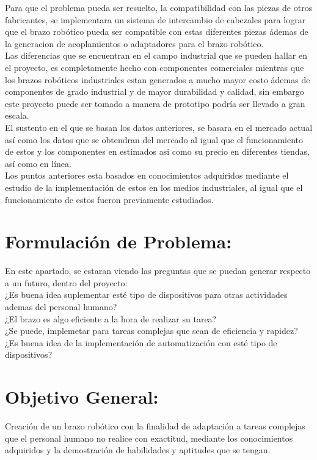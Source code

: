 \documentclass[14pt,a4paper]{article}
\begin{document}
Para que el problema pueda ser resuelto, la compatibilidad con las piezas de otros fabricantes, se implementara un sistema de intercambio de cabezales para lograr que el brazo robótico pueda ser compatible con estas diferentes piezas ádemas de la generacion de acoplamientos o adaptadores para el brazo robótico. \\
Las diferencias que se encuentran en el campo industrial que se pueden hallar en el proyecto, es completamente hecho con componentes comerciales mientras que los brazos robóticos industriales estan generados a mucho mayor costo ádemas de componentes de grado industrial y de mayor durabilidad y calidad, sin embargo este proyecto puede ser tomado a manera de prototipo podría ser llevado a gran escala.\\
El sustento en el que se basan los datos anteriores, se basara en el mercado actual así como los datos que se obtendran del mercado al igual que el funcionamiento de estos y los componentes en estimados asi como su precio en diferentes tiendas, así como en línea.\\
Los puntos anteriores esta basados en conocimientos adquiridos mediante el estudio de la implementación de estos en los medios industriales, al igual que el funcionamiento de estos fueron previamente estudiados.

\section{Formulación de Problema:}

En este apartado, se estaran viendo las preguntas que se puedan generar respecto a un futuro, dentro del proyecto:\\

¿Es buena idea suplementar esté tipo de dispositivos para otras actividades ademas del personal humano?\\
¿El brazo es algo eficiente a la hora de realizar su tarea?\\
¿Se puede, implemetar para tareas complejas que sean de eficiencia y rapidez?\\
¿Es buena idea de la implementación de automatización con esté tipo de dispositivos? 

\section{Objetivo General:}

Creación de un brazo robótico con la finalidad de adaptación a tareas complejas que el personal humano no realice con exactitud, mediante los conocimientos adquiridos y la demostración de habilidades y aptitudes que se tengan. 
\end{document}
